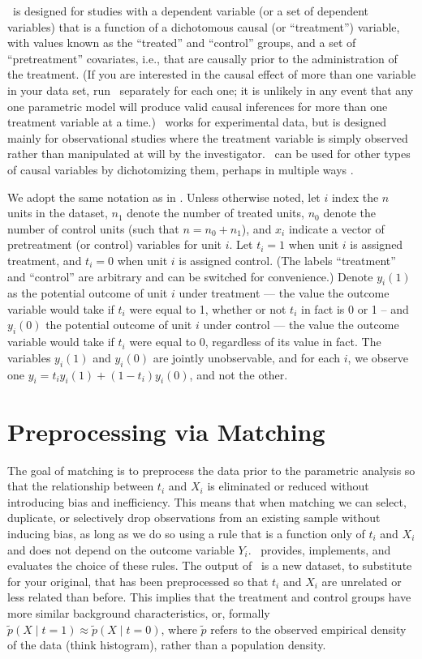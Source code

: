 
\MatchIt\ is designed for studies with a dependent variable (or a set
of dependent variables) that is a function of a dichotomous causal (or
``treatment'') variable, with values known as the ``treated'' and
``control'' groups, and a set of ``pretreatment'' covariates, i.e.,
that are causally prior to the administration of the treatment.  (If
you are interested in the causal effect of more than one variable in
your data set, run \MatchIt\ separately for each one; it is unlikely
in any event that any one parametric model will produce valid causal
inferences for more than one treatment variable at a time.)  \MatchIt\
works for experimental data, but is designed mainly for observational
studies where the treatment variable is simply observed rather than
manipulated at will by the investigator.  \MatchIt\ can be used for
other types of causal variables by dichotomizing them, perhaps in
multiple ways \citep[see also][]{ImaDyk04}.

We adopt the same notation as in \citet*{HoImaKin05}. Unless otherwise
noted, let $i$ index the $n$ units in the dataset, $n_1$ denote the
number of treated units, $n_0$ denote the number of control units
(such that $n=n_0+n_1$), and $x_i$ indicate a vector of pretreatment
(or control) variables for unit $i$.  Let $t_i=1$ when unit $i$ is
assigned treatment, and $t_i=0$ when unit $i$ is assigned control.
(The labels ``treatment'' and ``control'' are arbitrary and can be
switched for convenience.)  Denote $y_i(1)$ as the potential outcome
of unit $i$ under treatment --- the value the outcome variable would
take if $t_i$ were equal to 1, whether or not $t_i$ in fact is 0 or 1
-- and $y_i(0)$ the potential outcome of unit $i$ under control ---
the value the outcome variable would take if $t_i$ were equal to 0,
regardless of its value in fact.  The variables $y_i(1)$ and $y_i(0)$
are jointly unobservable, and for each $i$, we observe one
$y_i=t_iy_i(1)+(1-t_i)y_i(0)$, and not the other.

\section{Preprocessing via Matching}

The goal of matching is to preprocess the data prior to the parametric
analysis so that the relationship between $t_i$ and $X_i$ is
eliminated or reduced without introducing bias and inefficiency.  This
means that when matching we can select, duplicate, or selectively drop
observations from an existing sample without inducing bias, as long as
we do so using a rule that is a function only of $t_i$ and $X_i$ and
does not depend on the outcome variable $Y_i$.  \MatchIt\ provides,
implements, and evaluates the choice of these rules.  The output of
\MatchIt\ is a new dataset, to substitute for your original, that has
been preprocessed so that $t_i$ and $X_i$ are unrelated or less
related than before.  This implies that the treatment and control
groups have more similar background characteristics, or, formally
$\tilde p(X\mid t=1) \approx \tilde p(X\mid t=0)$, where $\tilde p$
refers to the observed empirical density of the data (think
histogram), rather than a population density.

